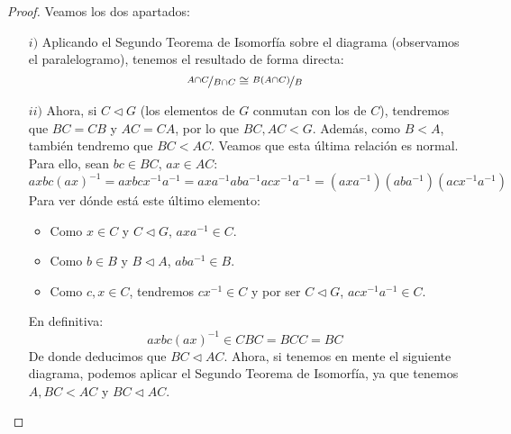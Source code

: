 \begin{lema}
    \begin{proof}
        Veamos los dos apartados:
        \begin{enumerate}
            \item[$i)$] Aplicando el Segundo Teorema de Isomorfía sobre el diagrama (observamos el paralelogramo), tenemos el resultado de forma directa:
                \begin{equation*}
                    \nicefrac{A\cap C}{B\cap C} \cong \nicefrac{B(A\cap C)}{B}
                \end{equation*}
            \item[$ii)$] Ahora, si $C\lhd G$ (los elementos de $G$ conmutan con los de $C$), tendremos que $BC = CB$ y $AC = CA$, por lo que $BC, AC < G$. Además, como $B<A$, también tendremo que $BC < AC$. Veamos que esta última relación es normal. Para ello, sean $bc\in BC$, $ax\in AC$:
                \begin{equation*}
                    axbc{(ax)}^{-1} = axbcx^{-1}a^{-1} = axa^{-1}aba^{-1}acx^{-1}a^{-1} = (axa^{-1})(aba^{-1})(acx^{-1}a^{-1})
                \end{equation*}
                Para ver dónde está este último elemento:
                \begin{itemize}
                    \item Como $x\in C$ y $C\lhd G$, $axa^{-1} \in C$.
                    \item Como $b\in B$ y $B\lhd A$, $aba^{-1}\in B$.
                    \item Como $c,x\in C$, tendremos $cx^{-1}\in C$ y por ser $C\lhd G$, $acx^{-1}a^{-1} \in C$.
                \end{itemize}
                En definitiva:
                \begin{equation*}
                    axbc{(ax)}^{-1} \in CBC = BCC = BC
                \end{equation*}
                De donde deducimos que $BC\lhd AC$. Ahora, si tenemos en mente el siguiente diagrama, podemos aplicar el Segundo Teorema de Isomorfía, ya que tenemos $A,BC< AC$ y $BC\lhd AC$.

                \begin{figure}[H]
                    \centering
\end{figure}
\end{enumerate}
\end{proof}
\end{lema}
